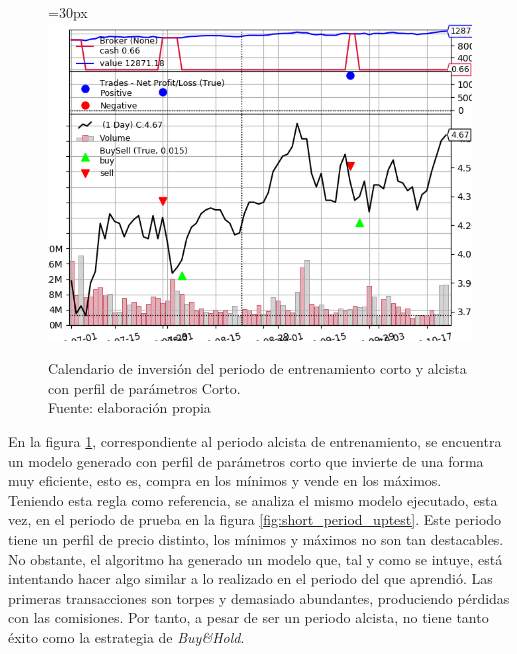      	\begin{figure}[H]
     		\centering\leftskip=30px
     		\includegraphics[scale=0.70]{imagenes/S_Short_train.png}
     		\caption[Calendario de inversi\'on del periodo de entrenamiento corto alcista.]{Calendario de inversi\'on del periodo de entrenamiento corto y alcista con perfil de par\'ametros Corto.\\ Fuente: elaboraci\'on propia}
     		\label{fig:short_period_uptrain}
     	\end{figure}
     	
En la figura \ref{fig:short_period_uptrain}, correspondiente al periodo alcista de entrenamiento, se encuentra un modelo generado con perfil de par\'ametros corto que invierte de una forma muy eficiente, esto es, compra en los m\'inimos y vende en los m\'aximos. \\

Teniendo esta regla como referencia, se analiza el mismo modelo ejecutado, esta vez, en el periodo de prueba en la figura \ref{fig:short_period_uptest}. Este periodo tiene un perfil de precio distinto, los m\'inimos y m\'aximos no son tan destacables. No obstante, el algoritmo ha generado un modelo que, tal y como se intuye, est\'a intentando hacer algo similar a lo realizado en el periodo del que aprendi\'o. Las primeras transacciones son torpes y demasiado abundantes, produciendo p\'erdidas con las comisiones.	Por tanto, a pesar de ser un periodo alcista, no tiene tanto \'exito como la estrategia de \textit{Buy\&Hold}.\\
     	
